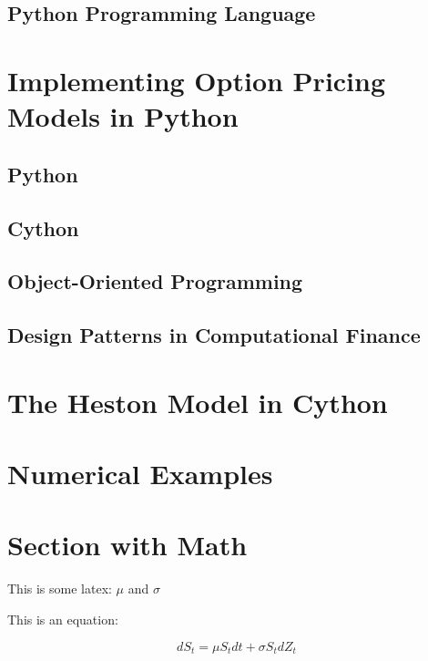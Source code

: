\documentclass[11pt,]{article}
\begin{document}
\subsection{Python Programming
Language}\label{python-programming-language}

\section{Implementing Option Pricing Models in
Python}\label{implementing-option-pricing-models-in-python}

\subsection{Python}\label{python}

\subsection{Cython}\label{cython}

\subsection{Object-Oriented
Programming}\label{object-oriented-programming}

\subsection{Design Patterns in Computational
Finance}\label{design-patterns-in-computational-finance}

\section{The Heston Model in Cython}\label{the-heston-model-in-cython}

\section{Numerical Examples}\label{numerical-examples}

\section{Section with Math}\label{section-with-math}

This is some latex: \(\mu\) and \(\sigma\)

This is an equation:

\[
dS_{t} = \mu S_{t} dt + \sigma S_{t} dZ_{t}
\]

\newpage
\singlespacing 

\end{document}
